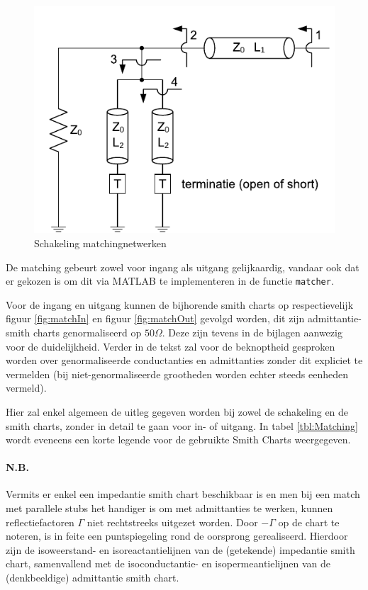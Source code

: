   \begin{figure}[!hb]
    \centering
    \includegraphics[keepaspectratio=true]{fig/matching.pdf}
    \caption{Schakeling matchingnetwerken}
    \label{fig:schakelingMatch}
  \end{figure}

  De matching gebeurt zowel voor ingang als uitgang gelijkaardig, vandaar ook
  dat er gekozen is om dit via MATLAB te implementeren in de functie \texttt{matcher}.

  Voor de ingang en uitgang kunnen de bijhorende smith charts op respectievelijk
  figuur \ref{fig:matchIn} en figuur \ref{fig:matchOut} gevolgd worden, dit
  zijn admittantie-smith charts genormaliseerd op $50 \Omega$. Deze zijn
  tevens in de bijlagen aanwezig voor de duidelijkheid. Verder in de tekst
  zal voor de beknoptheid gesproken worden over genormaliseerde conductanties
  en admittanties zonder dit expliciet te vermelden (bij niet-genormaliseerde
  grootheden worden echter steeds eenheden vermeld).

  Hier zal enkel algemeen de uitleg gegeven worden bij zowel de schakeling en de smith charts, zonder in
  detail te gaan voor in- of uitgang. In tabel \ref{tbl:Matching} wordt eveneens
  een korte legende voor de gebruikte Smith Charts weergegeven.

  \paragraph{N.B.} Vermits er enkel een impedantie smith chart beschikbaar is
  en men bij een match met parallele stubs het handiger is om met admittanties
  te werken, kunnen reflectiefactoren $\Gamma$ niet rechtstreeks uitgezet worden.
  Door $-\Gamma$ op de chart te noteren, is in feite een puntspiegeling rond de
  oorsprong gerealiseerd. Hierdoor zijn de isoweerstand- en isoreactantielijnen
  van de (getekende) impedantie smith chart, samenvallend met de isoconductantie-
  en isopermeantielijnen van de (denkbeeldige) admittantie smith chart.


